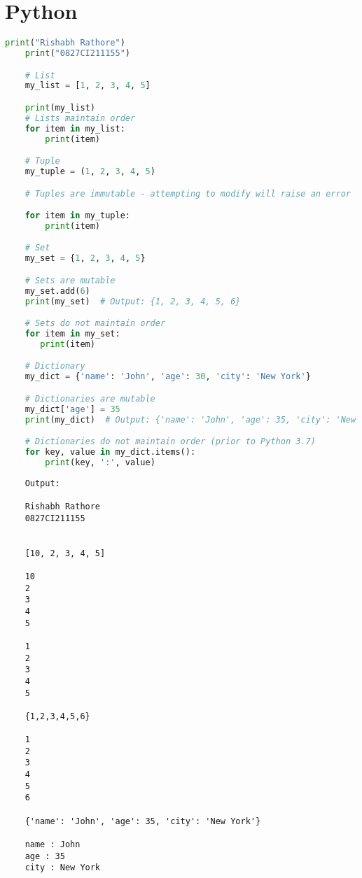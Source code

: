 \documentclass{report}
\begin{document}
\pagebreak

\setcounter{chapter}{1}
\setcounter{section}{0}
\section{Python}
\sol 
\begin{lstlisting}[language=Python]
	print("Rishabh Rathore")
	print("0827CI211155")

	# List
	my_list = [1, 2, 3, 4, 5]

	print(my_list)
	# Lists maintain order
	for item in my_list:
    	print(item)

	# Tuple
	my_tuple = (1, 2, 3, 4, 5)

	# Tuples are immutable - attempting to modify will raise an error

	for item in my_tuple:
    	print(item)

	# Set
	my_set = {1, 2, 3, 4, 5}

	# Sets are mutable
	my_set.add(6)
	print(my_set)  # Output: {1, 2, 3, 4, 5, 6}

	# Sets do not maintain order
	for item in my_set:
 	   print(item)

	# Dictionary
	my_dict = {'name': 'John', 'age': 30, 'city': 'New York'}

	# Dictionaries are mutable
	my_dict['age'] = 35
	print(my_dict)  # Output: {'name': 'John', 'age': 35, 'city': 'New York'}

	# Dictionaries do not maintain order (prior to Python 3.7)
	for key, value in my_dict.items():
    	print(key, ':', value)


\end{lstlisting}

\begin{verbatim}
	Output:

	Rishabh Rathore
	0827CI211155


	[10, 2, 3, 4, 5]

	10
	2
	3
	4
	5

	1
	2
	3
	4
	5

	{1,2,3,4,5,6}

	1
	2
	3
	4
	5
	6

	{'name': 'John', 'age': 35, 'city': 'New York'}

	name : John
	age : 35
	city : New York

\end{verbatim}

\end{document}
